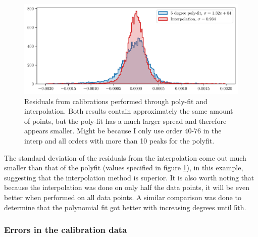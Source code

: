     \begin{figure}%
        \begin{wide}  
            \includegraphics[width=\textwidth]{figures/hist_peak_residuals_poly_and_interp.pdf}
            \caption{Residuals from calibrations performed through poly-fit and interpolation. Both results contain approximately the same amount of points, but the poly-fit has a much larger spread and therefore appears smaller.  Might be because I only use order 40-76 in the interp and all orders with more than 10 peaks for the polyfit.  }
            \label{fig:calib_poly_vs_interp}
        \end{wide}
    \end{figure}

    The standard deviation of the residuals from the interpolation come out much smaller than that of the polyfit (values specified in figure \ref{fig:calib_poly_vs_interp}), in this example, suggesting that the interpolation method is superior. It is also worth noting that because the interpolation was done on only half the data points, it will be even better when performed on all data points. A similar comparison was done to determine that the polynomial fit got better with increasing degrees until 5th. 

    \vspace{0.5cm}




    \subsubsection{Errors in the calibration data}

